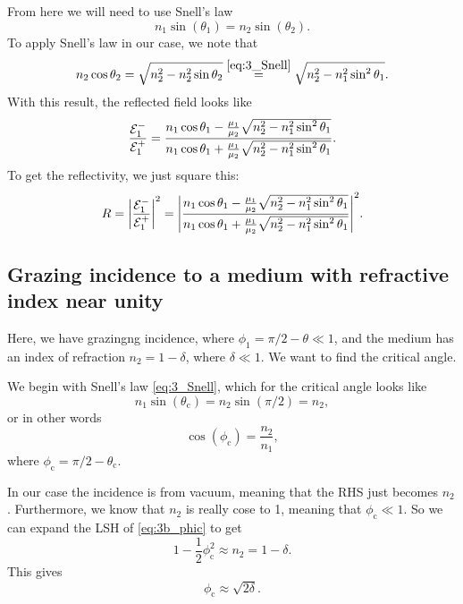 \documentclass[11pt,letter, swedish, english
]{article}
\begin{document}
From here we will need to use Snell's law
\begin{equation}\label{eq:3_Snell}
n_1\sin(\theta_1) = n_2\sin(\theta_2).
\end{equation}
To apply Snell's law in our case, we note that
\begin{equation}
n_2\cos\theta_2 = \sqrt{n_2^2 - n_2^2\sin\theta_2}
\stackrel{\eqref{eq:3_Snell}}{=} \sqrt{n_2^2 - n_1^2\sin^2\theta_1}.
\end{equation}
With this result, the reflected field looks like
\begin{equation}\label{eq:3a_refl-ampl}
\frac{{\mathcal{E}_1^-}}{{\mathcal{E}_1^+}}=
\frac{n_1\cos\theta_1 - 
\frac{\mu_1}{\mu_2}\sqrt{n_2^2-n_1^2\sin^2\theta_1}}
{n_1\cos\theta_1 + \frac{\mu_1}{\mu_2}\sqrt{n_2^2-n_1^2\sin^2\theta_1}}.
\end{equation}
To get the reflectivity, we just square this:
\begin{equation}
R=\abs{\frac{{\mathcal{E}_1^-}}{{\mathcal{E}_1^+}}}^2=
\abs{\frac{n_1\cos\theta_1 - 
\frac{\mu_1}{\mu_2}\sqrt{n_2^2-n_1^2\sin^2\theta_1}}
{n_1\cos\theta_1 + \frac{\mu_1}{\mu_2}\sqrt{n_2^2-n_1^2\sin^2\theta_1}}
}^2.
\end{equation}





\subsection{Grazing incidence to a medium with 
refractive index near unity}
\newcommand{\thetac}{\theta_\text{c}}
\newcommand{\phic}{\phi_\text{c}}

Here, we have grazingng incidence, where 
$\phi_1=\pi/2 - \theta\ll1$, and the medium has an index of refraction
$n_2=1-\delta$, where $\delta\ll1$. We want to find the critical angle. 

We begin with Snell's law \eqref{eq:3_Snell},
which for the critical angle looks like
\begin{equation}
n_1\sin(\thetac) = n_2\sin(\pi/2) = n_2,
\end{equation}
or in other words
\begin{equation}\label{eq:3b_phic}
\cos(\phic) = \frac{n_2}{n_1},
\end{equation}
where $\phic=\pi/2-\thetac$.

In our case the incidence is from vacuum, meaning that the RHS just
becomes $n_2$. Furthermore, we know that $n_2$ is really cose to 1,
meaning that $\phic\ll1$. So we can expand the LSH of
\eqref{eq:3b_phic} to get
\begin{equation}
1-\frac{1}{2}\phic^2 \approx n_2 = 1-\delta.
\end{equation}
This gives
\begin{equation}\label{eq:3b_phic}
\phic \approx \sqrt{2\delta}.
\end{equation}
\end{document}
